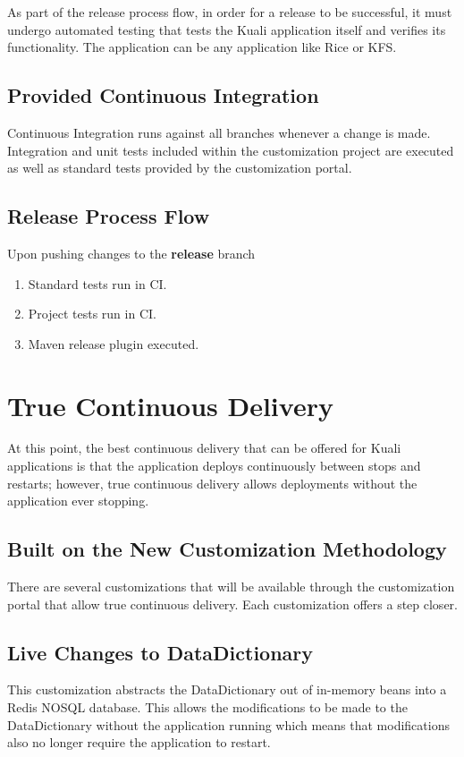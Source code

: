 \documentclass[12pt]{report}
\begin{document}
As part of the release process flow, in order for a release to be successful, it must undergo automated testing that tests
the Kuali application itself and verifies its functionality. The application can be any application like Rice or KFS. 

\subsection{Provided Continuous Integration}

Continuous Integration runs against all branches whenever a change is made. Integration and unit tests included within the
customization project are executed as well as standard tests provided by the customization portal.

\subsection{Release Process Flow}

Upon pushing changes to the \textbf{release} branch
\begin{enumerate}
  \item Standard tests run in CI.
  \item Project tests run in CI.
  \item Maven release plugin executed.
\end{enumerate}

\section{True Continuous Delivery}

At this point, the best continuous delivery that can be offered for Kuali applications is that the application deploys continuously
between stops and restarts; however, true continuous delivery allows deployments without the application ever stopping. 

\subsection{Built on the New Customization Methodology}
There are several customizations that will be available through the customization portal that allow true continuous delivery. Each
customization offers a step closer.

\subsection{Live Changes to DataDictionary}
This customization abstracts the DataDictionary out of in-memory beans into a Redis NOSQL database. This allows the modifications to
be made to the DataDictionary without the application running which means that modifications also no longer require the application
to restart.
\end{document}
